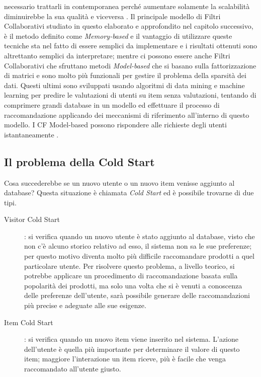 necessario trattarli in contemporanea perché aumentare solamente la scalabilità diminuirebbe la sua qualità e viceversa 
\cite{item-based-collaborative-filtering}.\hfill\break
Il principale modello di Filtri Collaborativi studiato in questo elaborato e approfondito nel capitolo successivo, è il metodo definito 
come \textit{Memory-based} e il  vantaggio di utilizzare queste tecniche sta nel fatto di essere semplici da implementare e i risultati 
ottenuti sono altrettanto semplici da interpretare; mentre ci possono essere anche Filtri Collaborativi che sfruttano metodi 
\textit{Model-based} che si basano sulla fattorizzazione di matrici e sono molto più funzionali per gestire il problema della 
sparsità dei dati. Questi ultimi sono sviluppati usando algoritmi di data mining e machine learning per predire le valutazioni di utenti 
su item senza valutazioni, tentando di comprimere grandi database in un modello ed effettuare il processo di raccomandazione applicando dei 
meccanismi di riferimento all'interno di questo modello.
I CF Model-based possono rispondere alle richieste degli utenti istantaneamente \cite{model-based-approach-for-collaborative-filtering}.
%
\subsection{Il problema della Cold Start}
Cosa succederebbe se un nuovo utente o un nuovo item venisse aggiunto al database? Questa situazione è chiamata \textit{Cold Start} ed 
è possibile trovarne di due tipi.
\begin{description}
    \item[Visitor Cold Start]: si verifica quando un nuovo utente è stato aggiunto al database, visto che non c'è alcuno storico relativo ad esso, il sistema non 
    sa le sue preferenze; per questo motivo diventa molto più difficile raccomandare prodotti a quel particolare utente. Per risolvere questo problema, 
    a livello teorico, si potrebbe applicare un procedimento di raccomandazione basata sulla popolarità dei prodotti, ma solo una volta che si è venuti a 
    conoscenza delle preferenze dell'utente, sarà possibile generare delle raccomandazioni più precise e adeguate alle sue esigenze.
    \item[Item Cold Start]: si verifica quando un nuovo item viene inserito nel sistema. L'azione dell'utente è quella più importante per determinare 
    il valore di questo item; maggiore l'interazione un item riceve, più è facile che venga raccomandato all'utente giusto.
\end{description}
